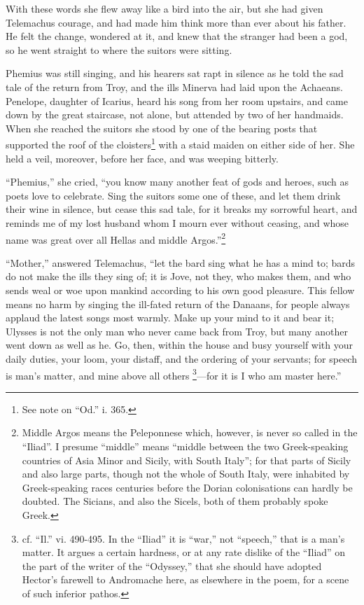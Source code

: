With these words she flew away like a bird into the air, but she had given
Telemachus courage, and had made him think more than ever about his father. He
felt the change, wondered at it, and knew that the stranger had been a god, so
he went straight to where the suitors were sitting.

Phemius was still singing, and his hearers sat rapt in silence as he told the
sad tale of the return from Troy, and the ills Minerva had laid upon the
Achaeans. Penelope, daughter of Icarius, heard his song from her room upstairs,
and came down by the great staircase, not alone, but attended by two of her
handmaids. When she reached the suitors she stood by one of the bearing posts
that supported the roof of the cloisters\footnote{See note on “Od.” i. 365.} with a staid maiden on either side of
her. She held a veil, moreover, before her face, and was weeping bitterly.

“Phemius,” she cried, “you know many another feat of gods and heroes, such as
poets love to celebrate. Sing the suitors some one of these, and let them drink
their wine in silence, but cease this sad tale, for it breaks my sorrowful
heart, and reminds me of my lost husband whom I mourn ever without ceasing, and
whose name was great over all Hellas and middle Argos.”\footnote{Middle Argos means the Peleponnese which, however, is never so called in the
“Iliad”. I presume “middle” means “middle between the two Greek-speaking
countries of Asia Minor and Sicily, with South Italy”; for that parts of
Sicily and also large parts, though not the whole of South Italy, were
inhabited by Greek-speaking races centuries before the Dorian colonisations
can hardly be doubted. The Sicians, and also the Sicels, both of them probably
spoke Greek.}

“Mother,” answered Telemachus, “let the bard sing what he has a mind to; bards
do not make the ills they sing of; it is Jove, not they, who makes them, and
who sends weal or woe upon mankind according to his own good pleasure. This
fellow means no harm by singing the ill-fated return of the Danaans, for people
always applaud the latest songs most warmly. Make up your mind to it and bear
it; Ulysses is not the only man who never came back from Troy, but many another
went down as well as he. Go, then, within the house and busy yourself with your
daily duties, your loom, your distaff, and the ordering of your servants; for
speech is man’s matter, and mine above all others \footnote{cf. “Il.” vi. 490-495. In the “Iliad” it is “war,” not “speech,” that is a
man’s matter. It argues a certain hardness, or at any rate dislike of the
“Iliad” on the part of the writer of the “Odyssey,” that she should have
adopted Hector’s farewell to Andromache here, as elsewhere in the poem, for a
scene of such inferior pathos.}—for it is I who am master here.”

